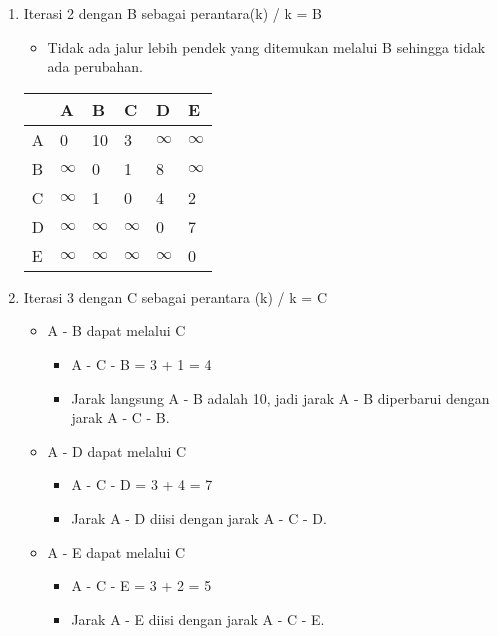 \begin{enumerate}
    \item Iterasi 2 dengan B sebagai perantara(k) / k = B
    \begin{itemize}
        \item Tidak ada jalur lebih pendek yang ditemukan melalui B sehingga tidak ada perubahan.
    \end{itemize}
    \begin{table}[h]
        \begin{tabular}{|l|l|l|l|l|l|}
        \hline
          & A        & B        & C        & D        & E        \\ \hline
        A & 0        & 10       & 3        & $\infty$ & $\infty$ \\ \hline
        B & $\infty$ & 0        & 1        & 8        & $\infty$ \\ \hline
        C & $\infty$ & 1        & 0        & 4        & 2        \\ \hline
        D & $\infty$ & $\infty$ & $\infty$ & 0        & 7        \\ \hline
        E & $\infty$ & $\infty$ & $\infty$ & $\infty$ & 0        \\ \hline
        \end{tabular}
    \end{table}
\newpage
    \item Iterasi 3 dengan C sebagai perantara (k) / k = C
    \begin{itemize}
        \item A - B dapat melalui C
        \begin{itemize}
            \item A - C - B = 3 + 1 = 4
            \item Jarak langsung A - B adalah 10, jadi jarak A - B diperbarui dengan jarak A - C - B.
        \end{itemize}
        \item A - D dapat melalui C
        \begin{itemize}
            \item A - C - D = 3 + 4 = 7
            \item Jarak A - D diisi dengan jarak A - C - D.
        \end{itemize}
        \item A - E dapat melalui C
        \begin{itemize}
            \item A - C - E = 3 + 2 = 5
            \item Jarak A - E diisi dengan jarak A - C - E.

\end{itemize}
\end{itemize}
\end{enumerate}
